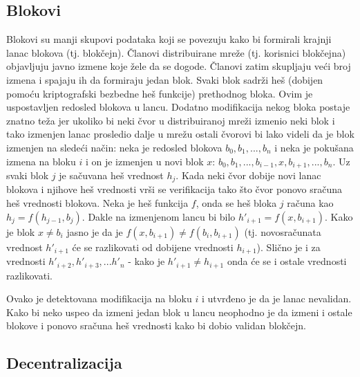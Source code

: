 \documentclass[a4paper]{article}
\begin{document}
\subsection{Blokovi}
Blokovi su manji skupovi podataka koji se povezuju kako bi formirali krajnji lanac blokova (tj. blokčejn).
Članovi distribuirane mreže (tj. korisnici blokčejna) objavljuju javno izmene koje žele da se dogode.
Članovi zatim skupljaju veći broj izmena i spajaju ih da formiraju jedan blok.
Svaki blok sadrži heš (dobijen pomoću kriptografski bezbedne heš funkcije) prethodnog bloka.
Ovim je uspostavljen redosled blokova u lancu. Dodatno modifikacija nekog bloka postaje znatno teža jer ukoliko
bi neki čvor u distribuiranoj mreži izmenio neki blok i tako izmenjen lanac prosledio dalje u mrežu
ostali čvorovi bi lako videli da je blok izmenjen na sledeći način: neka je redosled blokova $b_0,b_1,...,b_n$ i neka je pokušana izmena na bloku $i$ i on je izmenjen u novi blok $x$:
$b_0,b_1,...,b_{i-1},x,b_{i+1},...,b_n$.
Uz svaki blok $j$ je sačuvana heš vrednost $h_j$. Kada neki čvor dobije novi lanac blokova i njihove heš vrednosti vrši se verifikacija
tako što čvor ponovo sračuna heš vrednosti blokova. Neka je heš funkcija $f$, onda se heš bloka $j$ računa kao
$h_j = f(h_{j-1},b_j)$. Dakle na izmenjenom lancu bi bilo $h'_{i+1} = f(x,b_{i+1})$. Kako je blok $x \neq b_i$ jasno je
da je $f(x,b_{i+1}) \neq f(b_{i},b_{i+1})$ (tj. novosračunata vrednost $h'_{i+1}$ će se razlikovati od dobijene vrednosti $h_{i+1}$).
Slično je i za vrednosti $h'_{i+2},h'_{i+3},...h'_{n}$ - kako je $h'_{i+1} \neq h_{i+1}$ onda će se i ostale vrednosti razlikovati.

Ovako je detektovana modifikacija na bloku $i$ i utvrđeno je da je lanac nevalidan.
Kako bi neko uspeo da izmeni jedan blok u lancu neophodno je da izmeni i ostale blokove i ponovo sračuna
heš vrednosti kako bi dobio validan blokčejn. 

\subsection{Decentralizacija}
\end{document}
